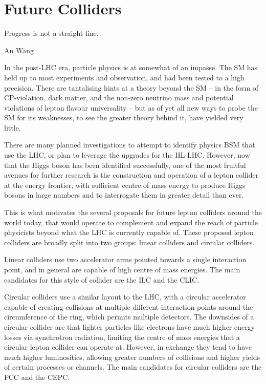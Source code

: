 \chapter{Future Colliders}
\label{chapter:colliders}

\epigraph{Progress is not a straight line.}{An Wang}

In the post-LHC era, particle physics is at somewhat of an impasse. The \acrfull{SM} has held up to most experiments and observation, and had been tested to a high precision. There are tantalising hints at a theory beyond the \acrlong{SM} -- in the form of CP-violation, dark matter, and the non-zero neutrino mass and potential violations of lepton flavour universality -- but as of yet all new ways to probe the \acrshort{SM} for its weaknesses, to see the greater theory behind it, have yielded very little. %

There are many planned investigations to attempt to identify physics \acrlong{BSM} that use the \acrfull{LHC}, or plan to leverage the upgrades for the \acrfull{HL-LHC}. However, now that the Higgs boson has been identified successfully, one of the most fruitful avenues for further research is the construction and operation of a lepton collider at the energy frontier, with sufficient centre of mass energy to produce Higgs bosons in large numbers and to interrogate them in greater detail than ever.

This is what motivates the several proposals for future lepton colliders around the world today, that would operate to complement and expand the reach of particle physicists beyond what the \acrshort{LHC} is currently capable of. These proposed lepton colliders are broadly split into two groups: linear colliders and circular colliders. 

Linear colliders use two accelerator arms pointed towards a single interaction point, and in general are capable of high centre of mass energies. The main candidates for this style of collider are the \acrfull{ILC} and the \acrfull{CLIC}. 

Circular colliders use a similar layout to the \acrshort{LHC}, with a circular accelerator capable of creating collisions at multiple different interaction points around the circumference of the ring, which permits multiple detectors. The downsides of a circular collider are that lighter particles like electrons have much higher energy losses via synchrotron radiation, limiting the centre of mass energies that a circular lepton collider can operate at. However, in exchange they tend to have much higher luminosities, allowing greater numbers of collisions and higher yields of certain processes or channels. The main candidates for circular colliders are the \acrfull{FCC} and the \acrfull{CEPC}. 

